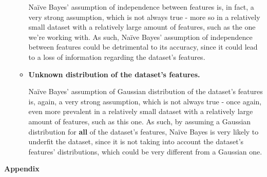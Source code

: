 \documentclass[12pt]{article}
\begin{document}
\begin{enumerate}[leftmargin=\labelsep,resume]
\begin{itemize}
                Naïve Bayes' assumption of independence between features is, in fact, a very
                strong assumption, which is not always true - more so in a relatively small dataset
                with a relatively large amount of features, such as the one we're working with.
                As such, Naïve Bayes' assumption of independence between features could be
                detrimental to its accuracy, since it could lead to a loss of information
                regarding the dataset's features.

          \item \textbf{Unknown distribution of the dataset's features.}

                Naïve Bayes' assumption of Gaussian distribution of the dataset's features
                is, again, a very strong assumption, which is not always true - once again,
                even more prevalent in a relatively small dataset with a relatively large
                amount of features, such as this one. As such, by assuming a Gaussian distribution
                for \textbf{all} of the dataset's features, Naïve Bayes is very likely to
                underfit the dataset, since it is not taking into account the dataset's
                features' distributions, which could be very different from a Gaussian one.
        \end{itemize}

\end{enumerate}

\pagebreak

\large{\textbf{Appendix}\vskip 0.3cm}


\end{document}
